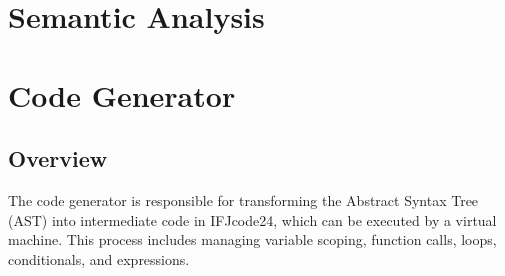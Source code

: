 \documentclass[12pt,a4paper]{article}
\begin{document}
\newpage

\section{Semantic Analysis}
\section{Code Generator}

\subsection{Overview}
The code generator is responsible for transforming the Abstract Syntax Tree (AST) into intermediate code in IFJcode24, which can be executed by a virtual machine. This process includes managing variable scoping, function calls, loops, conditionals, and expressions.

\end{document}
